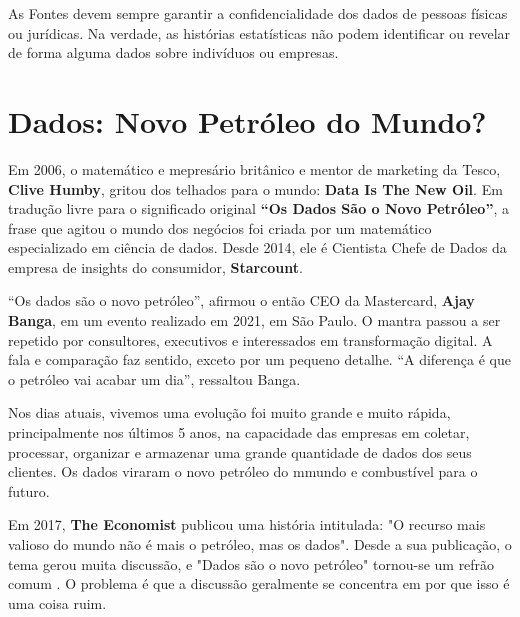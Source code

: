 As Fontes devem sempre garantir a confidencialidade dos dados de pessoas físicas ou jurídicas. Na verdade, as histórias estatísticas não podem identificar ou revelar de forma alguma dados sobre indivíduos ou empresas.\vskip0.3cm 



 \section{Dados: Novo Petróleo do Mundo?}

Em 2006, o matemático e mepresário britânico e mentor de marketing da Tesco, \textbf{Clive Humby}, gritou dos telhados para o mundo: \textbf{Data Is The New Oil}. Em tradução livre para o significado original \textbf{“Os Dados São o Novo Petróleo”}, a frase que agitou o mundo dos negócios foi criada por um matemático especializado em ciência de dados. Desde 2014, ele é Cientista Chefe de Dados da empresa de insights do consumidor, \textbf{Starcount}. \vskip0.3cm 




“Os dados são o novo petróleo”, afirmou o então CEO da Mastercard, \textbf{Ajay Banga}, em um evento realizado em 2021, em São Paulo. O mantra passou a ser repetido por consultores, executivos e interessados em transformação digital. A fala e comparação faz sentido, exceto por um pequeno detalhe. “A diferença é que o petróleo vai acabar um dia”, ressaltou Banga.\vskip0.3cm 



Nos dias atuais, vivemos uma evolução foi muito grande e muito rápida, principalmente nos últimos 5 anos, na capacidade das empresas em coletar, processar, organizar e armazenar uma grande quantidade de dados dos seus clientes. Os dados viraram o novo petróleo do mmundo e combustível para o futuro.\vskip0.3cm 







 Em 2017, \textbf{The Economist} publicou uma história intitulada: "O recurso mais valioso do mundo não é mais o petróleo, mas os dados". Desde a sua publicação, o tema gerou muita discussão, e "Dados são o novo petróleo" tornou-se um refrão comum . O problema é que a discussão geralmente se concentra em por que isso é uma coisa ruim.\vskip0.3cm 


